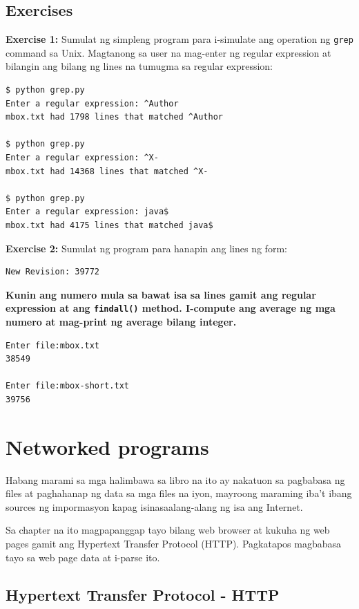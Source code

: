 \documentclass[10pt,]{book}
\begin{document}
\section{Exercises}\label{exercises-10}

\textbf{Exercise 1:} Sumulat ng simpleng program para i-simulate ang
operation ng \texttt{grep} command sa Unix. Magtanong sa user na
mag-enter ng regular expression at bilangin ang bilang ng lines na
tumugma sa regular expression:

{\small
\begin{verbatim}
$ python grep.py
Enter a regular expression: ^Author
mbox.txt had 1798 lines that matched ^Author

$ python grep.py
Enter a regular expression: ^X-
mbox.txt had 14368 lines that matched ^X-

$ python grep.py
Enter a regular expression: java$
mbox.txt had 4175 lines that matched java$
\end{verbatim}
}

\textbf{Exercise 2:} Sumulat ng program para hanapin ang lines ng form:

{\small
\begin{verbatim}
New Revision: 39772
\end{verbatim}
}

\textbf{Kunin ang numero mula sa bawat isa sa lines gamit ang regular
expression at ang \texttt{findall()} method. I-compute ang average ng
mga numero at mag-print ng average bilang integer.}

{\small
\begin{verbatim}
Enter file:mbox.txt
38549

Enter file:mbox-short.txt
39756
\end{verbatim}
}

\chapter{Networked programs}\label{networked-programs}

Habang marami sa mga halimbawa sa libro na ito ay nakatuon sa pagbabasa
ng files at paghahanap ng data sa mga files na iyon, mayroong maraming
iba't ibang sources ng impormasyon kapag isinasaalang-alang ng isa ang
Internet.

Sa chapter na ito magpapanggap tayo bilang web browser at kukuha ng web
pages gamit ang Hypertext Transfer Protocol (HTTP). Pagkatapos magbabasa
tayo sa web page data at i-parse ito.

\section{Hypertext Transfer Protocol -
HTTP}\label{hypertext-transfer-protocol---http}
\end{document}
